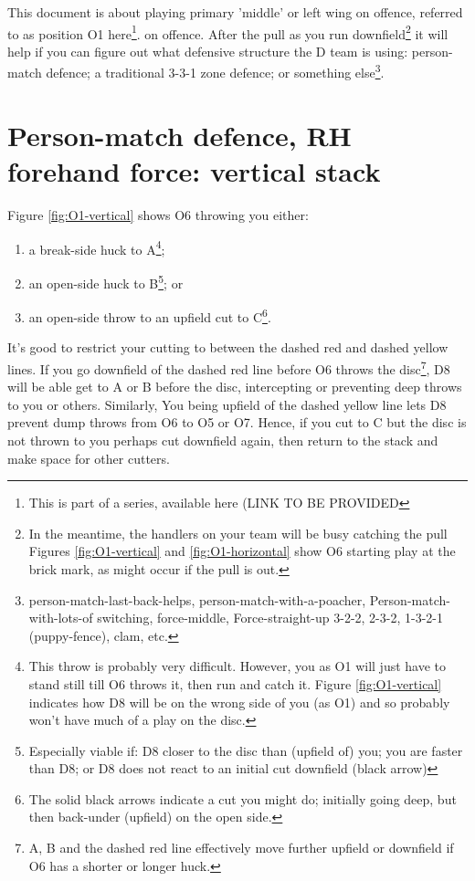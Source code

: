\documentclass{tufte-handout}
\begin{document}
This document is about 
playing primary 'middle' 
or left wing 
on offence,
referred to as position O1 here\footnote{This
is part of a series, 
available here (LINK TO BE PROVIDED}.
 on offence. 
After the pull 
as you run downfield\footnote{
In the meantime, 
the handlers on your team 
will be busy 
catching the pull
Figures \ref{fig:O1-vertical} and  \ref{fig:O1-horizontal} 
show O6 starting play 
at the brick mark, 
as might occur if 
the pull is out.} 
it will help 
if you can figure out 
what defensive structure the D team 
is using:
person-match defence;
a traditional 3-3-1 zone defence; or
something else\footnote{
person-match-last-back-helps,
person-match-with-a-poacher,
Person-match-with-lots-of switching,
force-middle,
Force-straight-up
3-2-2, 
2-3-2, 
1-3-2-1 (puppy-fence),
clam,
etc.}.

\section{Person-match defence, RH forehand force: vertical stack}\label{sec:vertical}
Figure \ref{fig:O1-vertical} shows 
O6 throwing you either:
\begin{enumerate}
\item a break-side 
huck to A\footnote{
This throw is 
probably
very difficult. 
However, you as O1
will just have to
stand still 
till O6 throws it, 
then run and catch it.
Figure \ref{fig:O1-vertical} indicates how 
D8 will be on the wrong side of you (as O1)
and so probably won't have much of a play on the disc.};
\item an open-side huck to B\footnote{
Especially viable if: 
D8 closer to the disc than (upfield of) you; 
you are faster than D8; or 
D8 does not react to an initial cut downfield (black arrow)}; or 
\item an open-side throw 
to an upfield cut to C\footnote{
The solid black arrows indicate 
a cut you might do;
initially going deep,
but then back-under
(upfield)
on the open side.}.
\end{enumerate}


It’s good to restrict your cutting 
to between 
the dashed red 
and dashed yellow lines. 
If you go 
downfield of the dashed red line 
before O6 throws the disc\footnote{
A, B 
and the dashed red line 
effectively move further upfield
or downfield
if O6 has a shorter or longer huck.},
D8 will be able 
get to
A or B 
before the disc,
intercepting 
or preventing 
deep throws to 
you or others. 
Similarly, 
You being 
upfield of the dashed yellow line
lets D8
prevent dump throws from O6
to O5 
or O7.
Hence,
if you cut to C
but the disc is not thrown to you
perhaps cut downfield again,
then return to the stack
and make space for other cutters. 
\end{document}
